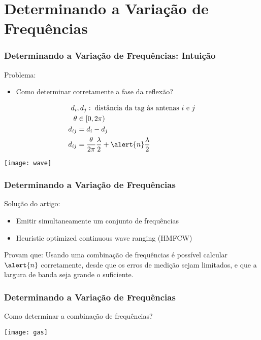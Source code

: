 \section{Determinando a Variação de Frequências}
\begin{frame}
    \frametitle{Determinando a Variação de Frequências: Intuição}
    Problema:
    \begin{itemize}
        \item Como determinar corretamente a \alert{fase da reflexão}?
    \end{itemize}
    \begin{align*}
        d_{i}&,d_{j}: \; \text{distância da tag às antenas $i$ e $j$} \\
        \theta& \in [0, 2\pi)\\
        d_{ij} & = d_i - d_j \\
        d_{ij} & = \dfrac{\theta}{2\pi} \dfrac{\lambda}{2} + \alert{n} \dfrac{\lambda}{2}
    \end{align*}

    \pause

    \begin{center}
        \texttt{[image: wave]}
    \end{center}
\end{frame}

\begin{frame}
    \frametitle{Determinando a Variação de Frequências}

    Solução do artigo:
    \begin{itemize}
        \item \alert{Emitir simultaneamente um conjunto de frequências}
        \item \alert{Heuristic optimized continuous wave ranging} (HMFCW)
    \end{itemize}

    \pause

    \begin{block}{Provam que:}
        Usando uma \alert{combinação de frequências} é possível calcular $\alert{n}$ corretamente,
        desde que os \alert{erros de medição sejam limitados},
        e que a \alert{largura de banda seja grande o suficiente}.
    \end{block}
\end{frame}

\begin{frame}
    \frametitle{Determinando a Variação de Frequências}
    Como determinar a combinação de frequências?
    \begin{center}
        \texttt{[image: gas]}
    \end{center}
\end{frame}

